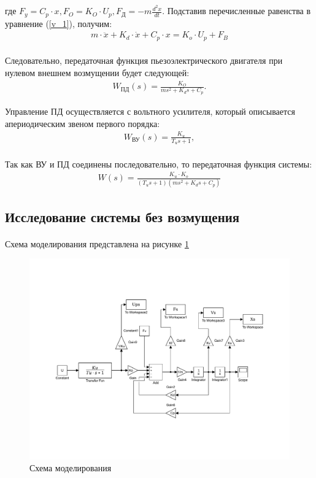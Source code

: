 \documentclass[a4paper,12pt]{article}
\begin{document}
		где $F_y = C_p\cdot x, F_O = K_O\cdot U_p, F_\text{Д} = -m\displaystyle{\frac{d^2x}{d t}}$. Подставив перечисленные равенства в уравнение (\ref{v_1}), получим:
		\begin{gather}
		m\cdot\ddot{x} + K_d\cdot\dot{x} + C_p\cdot x = K_o\cdot U_p + F_B
		\end{gather}\\
		
		Следовательно, передаточная функция пьезоэлектрического двигателя при нулевом внешнем возмущении будет следующей:
		\begin{gather} \label{v_2}
		W_\text{ПД}(s) = \displaystyle{\frac{K_O}{ms^2 + K_ds + C_p}}.
		\end{gather}
		
		Управление ПД осуществляется с вольтного усилителя, который описывается апериодическим звеном первого порядка:
		\begin{gather}
		W_\text{ВУ}(s) = \frac{K_u}{T_us + 1},
		\end{gather}\\
		
		Так как ВУ и ПД соединены последовательно, то передаточная функция системы:
		\begin{gather}
		\label{v_3}
		W(s)=\frac{K_u\cdot K_o}{(T_u s+1)(ms^2+K_d s+C_p)} 
		\end{gather}
	
	
	
	\newpage
	\begin{center}
	\section{Исследование системы без возмущения}
	\end{center}
	\paragraph {} Схема моделирования представлена на рисунке \ref{s_1}
	
	\begin{figure}[h]
		\renewcommand{\figurename}{Рисунок}
		\centering
		\includegraphics[width=6in]{Labb11.pdf}
		\caption{Схема моделирования}
		\label{s_1}
	\end{figure}
\end{document}
